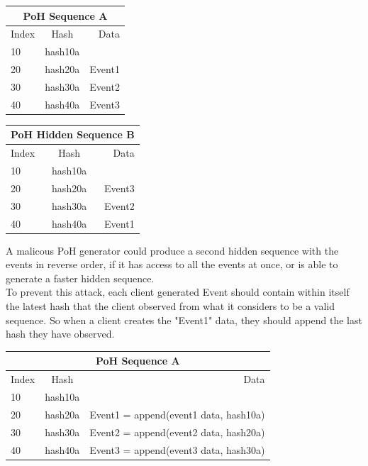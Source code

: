 \documentclass[12pt]{article}
\begin{document}
\begin{center}
  \begin{tabular}{ | l | c | r |}
    \hline
    \multicolumn{3}{|c|}{PoH Sequence A} \\
    \hline
    Index & Hash & Data \\ \hline
    10 & hash10a & \\ \hline
    20 & hash20a & Event1 \\ \hline
    30 & hash30a & Event2 \\ \hline
    40 & hash40a & Event3 \\
    \hline
    \end{tabular}
  \begin{tabular}{ | l | c | r |}
    \hline
    \multicolumn{3}{|c|}{PoH Hidden Sequence B} \\
    \hline
    Index & Hash & Data \\ \hline
    10 & hash10a & \\ \hline
    20 & hash20a & Event3 \\ \hline
    30 & hash30a & Event2 \\ \hline
    40 & hash40a & Event1 \\
    \hline
    \end{tabular}
\end{center}

A malicous PoH generator could produce a second hidden sequence with the events in reverse order, if it has access to all the events at once, or is able to generate a faster hidden sequence.\\

To prevent this attack, each client generated Event should contain within itself the latest hash that the client observed from what it considers to be a valid sequence. So when a client creates the "Event1" data, they should append the last hash they have observed.\\

\begin{center}
  \begin{tabular}{ | l | c | r |}
    \hline
    \multicolumn{3}{|c|}{PoH Sequence A} \\
    \hline
    Index & Hash & Data \\ \hline
    10 & hash10a & \\ \hline
    20 & hash20a & Event1 = append(event1 data, hash10a) \\ \hline
    30 & hash30a & Event2 = append(event2 data, hash20a) \\ \hline
    40 & hash40a & Event3 = append(event3 data, hash30a) \\
    \hline
    \end{tabular}
\end{center}
\end{document}
